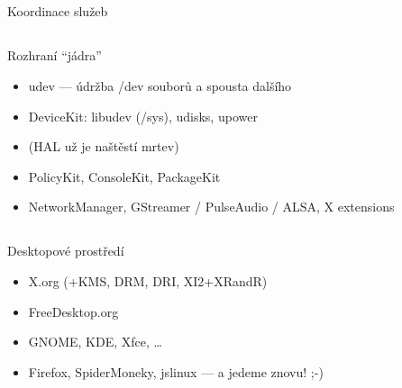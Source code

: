 \documentclass{beamer}
\begin{document}
\subsection{}
\begin{frame}{Koordinace služeb}
\end{frame}

\subsection{}
\begin{frame}{Rozhraní ``jádra''}
\begin{itemize}
\item udev --- údržba /dev souborů a spousta dalšího
\item DeviceKit: libudev (/sys), udisks, upower
\item (HAL už je naštěstí mrtev)
\item PolicyKit, ConsoleKit, PackageKit
\item NetworkManager, GStreamer / PulseAudio / ALSA, X extensions
\end{itemize}
\end{frame}

\subsection{}
\begin{frame}{Desktopové prostředí}
\begin{itemize}
\item X.org (+KMS, DRM, DRI, XI2+XRandR)
\item FreeDesktop.org
\item GNOME, KDE, Xfce, \dots
\item Firefox, SpiderMoneky, jslinux --- a jedeme znovu! ;-)
\end{itemize}
\end{frame}
\end{document}
